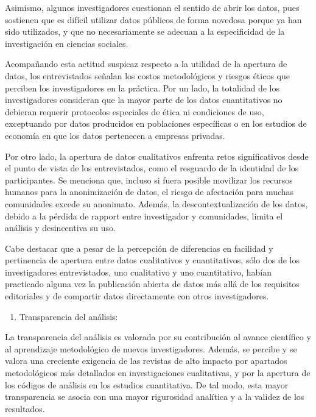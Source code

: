 \documentclass[
  letterpaper,
  DIV=11,
  numbers=noendperiod]{scrreprt}
\providecommand{\tightlist}{%
  \setlength{\itemsep}{0pt}\setlength{\parskip}{0pt}}\usepackage{longtable,booktabs,array}
\begin{document}
Asimismo, algunos investigadores cuestionan el sentido de abrir los
datos, pues sostienen que es difícil utilizar datos públicos de forma
novedosa porque ya han sido utilizados, y que no necesariamente se
adecuan a la especificidad de la investigación en ciencias sociales.

Acompañando esta actitud suspicaz respecto a la utilidad de la apertura
de datos, los entrevistados señalan los costos metodológicos y riesgos
éticos que perciben los investigadores en la práctica. Por un lado, la
totalidad de los investigadores consideran que la mayor parte de los
datos cuantitativos no debieran requerir protocolos especiales de ética
ni condiciones de uso, exceptuando por datos producidos en poblaciones
específicas o en los estudios de economía en que los datos pertenecen a
empresas privadas.

Por otro lado, la apertura de datos cualitativos enfrenta retos
significativos desde el punto de vista de los entrevistados, como el
resguardo de la identidad de los participantes. Se menciona que, incluso
si fuera posible movilizar los recursos humanos para la anonimización de
datos, el riesgo de afectación para muchas comunidades excede su
anonimato. Además, la descontextualización de los datos, debido a la
pérdida de rapport entre investigador y comunidades, limita el análisis
y desincentiva su uso.

Cabe destacar que a pesar de la percepción de diferencias en facilidad y
pertinencia de apertura entre datos cualitativos y cuantitativos, sólo
dos de los investigadores entrevistados, uno cualitativo y uno
cuantitativo, habían practicado alguna vez la publicación abierta de
datos más allá de los requisitos editoriales y de compartir datos
directamente con otros investigadores.

\begin{enumerate}
\def\labelenumi{\alph{enumi})}
\setcounter{enumi}{3}
\tightlist
\item
  Transparencia del análisis:
\end{enumerate}

La transparencia del análisis es valorada por su contribución al avance
científico y al aprendizaje metodológico de nuevos investigadores.
Además, se percibe y se valora una creciente exigencia de las revistas
de alto impacto por apartados metodológicos más detallados en
investigaciones cualitativas, y por la apertura de los códigos de
análisis en los estudios cuantitativa. De tal modo, esta mayor
transparencia se asocia con una mayor rigurosidad analítica y a la
validez de los resultados.
\end{document}
